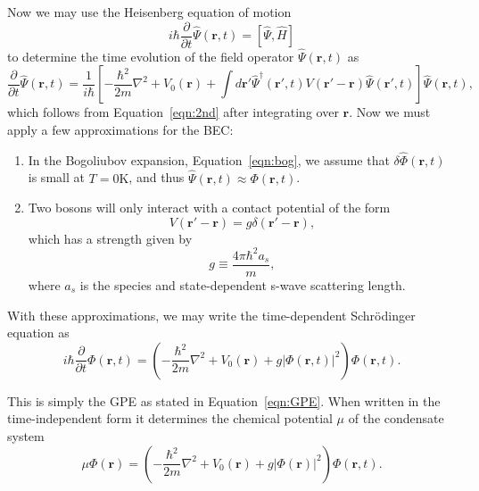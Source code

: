 Now we may use the Heisenberg equation of motion
\begin{equation}
    i\hbar \frac{\partial}{\partial t}\hat \Psi(\mathbf{r},t) = [\hat \Psi, \hat H]
\end{equation}
    to determine the time evolution of the field operator $\hat \Psi(\mathbf{r},t)$ as
\begin{equation}
    \frac{\partial}{\partial t}\hat \Psi(\mathbf{r},t) = \frac{1}{i\hbar}\left[-\frac{\hbar^2}{2m}\nabla^2 + V_0(\mathbf{r}) + \int d\mathbf{r'} \hat \Psi^\dagger(\mathbf{r'}, t)V(\mathbf{r'} -\mathbf{r})\hat \Psi(\mathbf{r'},t)\right]\hat \Psi(\mathbf{r},t),
\end{equation}
which follows from Equation~\eqref{eqn:2nd} after integrating over $\mathbf{r}$. 
Now we must apply a few approximations for the BEC:
\begin{enumerate}
    \item In the Bogoliubov expansion, Equation~\eqref{eqn:bog}, we assume that $\delta \hat \Phi(\mathbf{r},t)$ is small at $T = 0\text{K}$, and thus $\hat \Psi(\mathbf{r},t) \approx \Phi(\mathbf{r},t)$. 
    \item Two bosons will only interact with a contact potential of the form
    \begin{equation}
        V(\mathbf{r'}-\mathbf{r}) = g\delta(\mathbf{r'} - \mathbf{r}),
    \end{equation}
    which has a strength given by
    \begin{equation}
        g \equiv \frac{4 \pi \hbar^2 a_s}{m},
    \end{equation}
    where $a_s$ is the species and state-dependent s-wave scattering length.
\end{enumerate}

With these approximations, we may write the time-dependent Schr\"odinger equation as
\begin{equation}
    i\hbar \frac{\partial}{\partial t}\Phi(\mathbf{r},t) = \left( - \frac{\hbar^2}{2m} \nabla^2 + V_0(\mathbf{r}) + g |\Phi(\mathbf{r},t)|^2\right)\Phi(\mathbf{r},t).
\end{equation}

This is simply the GPE as stated in Equation~\eqref{eqn:GPE}.
When written in the time-independent form it determines the chemical potential $\mu$ of the condensate system~\cite{gross1961, pitaevskii1961}
\begin{equation}
    \mu\Phi(\mathbf{r}) = \left( - \frac{\hbar^2}{2m} \nabla^2 + V_0(\mathbf{r}) + g |\Phi(\mathbf{r})|^2\right)\Phi(\mathbf{r},t).
    \label{eqn:GP}
\end{equation}

